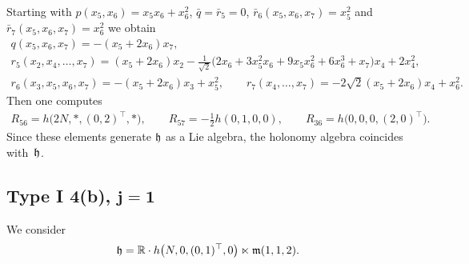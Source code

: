 \documentclass[pdftex]{sigma}
\numberwithin{equation}{section}
\newcommand\fh{{\frak h}}
\newcommand\fm{{\frak m}}
\newcommand\RR{{\mathbb R}}
\begin{document}
\begin{Example} Starting with $p(x_5,x_6)=x_5 x_6+x_6^2$, $\bar q=\bar r_5=0$, $\bar r_6(x_5,x_6,x_7)=x_5^2$ and $\bar r_7(x_5,x_6,x_7)=x_6^2$ we obtain
\begin{gather*}
q(x_5,x_6,x_7) = -(x_5+2x_6) x_7 ,\\
r_5(x_2,x_4,\dots, x_7) = (x_5+2x_6)x_2- \tfrac1{\sqrt2} \big(2x_6+3x_5^2x_6+9x_5x_6^2+6x_6^3+x_7\big) x_4 +2 x_4^2,\\
r_6(x_3,x_5,x_6,x_7)= -(x_5+2x_6) x_3+x_5^2,\qquad
r_7(x_4,\dots, x_7)= -2\sqrt 2(x_5+2x_6)x_4+ x_6^2 .
\end{gather*}
Then one computes
\begin{gather*}R_{56}=h\big(2N,*,(0,2)^\top,*\big),\qquad R_{57}=- \tfrac12 h(0,1,0,0),\qquad R_{36}= h\big(0,0,0,(2,0)^\top\big).\end{gather*}
Since these elements generate $\fh$ as a Lie algebra, the holonomy algebra coincides with~$\fh$.
\end{Example}

\subsection[Type I 4(b), $j=1$]{Type I 4(b), $\boldsymbol{j=1}$} \label{S3.9}
We consider
\begin{gather*}\fh=\RR\cdot h\big(N,0,(0,1)^\top,0\big) \ltimes\fm(1,1,2).\end{gather*}
\end{document}
